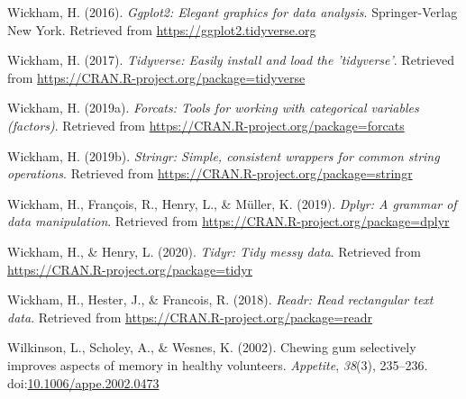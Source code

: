 \documentclass[man]{apa6}
\begin{document}
\leavevmode\hypertarget{ref-R-ggplot2}{}%
Wickham, H. (2016). \emph{Ggplot2: Elegant graphics for data analysis}. Springer-Verlag New York. Retrieved from \url{https://ggplot2.tidyverse.org}

\leavevmode\hypertarget{ref-R-tidyverse}{}%
Wickham, H. (2017). \emph{Tidyverse: Easily install and load the 'tidyverse'}. Retrieved from \url{https://CRAN.R-project.org/package=tidyverse}

\leavevmode\hypertarget{ref-R-forcats}{}%
Wickham, H. (2019a). \emph{Forcats: Tools for working with categorical variables (factors)}. Retrieved from \url{https://CRAN.R-project.org/package=forcats}

\leavevmode\hypertarget{ref-R-stringr}{}%
Wickham, H. (2019b). \emph{Stringr: Simple, consistent wrappers for common string operations}. Retrieved from \url{https://CRAN.R-project.org/package=stringr}

\leavevmode\hypertarget{ref-R-dplyr}{}%
Wickham, H., François, R., Henry, L., \& Müller, K. (2019). \emph{Dplyr: A grammar of data manipulation}. Retrieved from \url{https://CRAN.R-project.org/package=dplyr}

\leavevmode\hypertarget{ref-R-tidyr}{}%
Wickham, H., \& Henry, L. (2020). \emph{Tidyr: Tidy messy data}. Retrieved from \url{https://CRAN.R-project.org/package=tidyr}

\leavevmode\hypertarget{ref-R-readr}{}%
Wickham, H., Hester, J., \& Francois, R. (2018). \emph{Readr: Read rectangular text data}. Retrieved from \url{https://CRAN.R-project.org/package=readr}

\leavevmode\hypertarget{ref-wilkinsonChewingGumSelectively2002}{}%
Wilkinson, L., Scholey, A., \& Wesnes, K. (2002). Chewing gum selectively improves aspects of memory in healthy volunteers. \emph{Appetite}, \emph{38}(3), 235--236. doi:\href{https://doi.org/10.1006/appe.2002.0473}{10.1006/appe.2002.0473}

\endgroup
\end{document}
